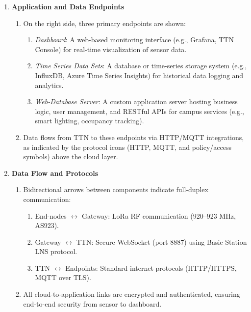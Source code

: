 \begin{enumerate}
    \item \textbf{Application and Data Endpoints}
          \begin{enumerate}
              \item On the right side, three primary endpoints are shown:
                    \begin{enumerate}
                        \item \textit{Dashboard}: A web-based monitoring interface (e.g., Grafana, TTN Console) for real-time visualization of sensor data.
                        \item \textit{Time Series Data Sets}: A database or time-series storage system (e.g., InfluxDB, Azure Time Series Insights) for historical data logging and analytics.
                        \item \textit{Web-Database Server}: A custom application server hosting business logic, user management, and RESTful APIs for campus services (e.g., smart lighting, occupancy tracking).
                    \end{enumerate}
              \item Data flows from TTN to these endpoints via HTTP/MQTT integrations, as indicated by the protocol icons (HTTP, MQTT, and policy/access symbols) above the cloud layer.
          \end{enumerate}

    \item \textbf{Data Flow and Protocols}
          \begin{enumerate}
              \item Bidirectional arrows between components indicate full-duplex communication:
                    \begin{enumerate}
                        \item End-nodes $\leftrightarrow$ Gateway: LoRa RF communication (920–923 MHz, AS923).
                        \item Gateway $\leftrightarrow$ TTN: Secure WebSocket (port 8887) using Basic Station LNS protocol.
                        \item TTN $\leftrightarrow$ Endpoints: Standard internet protocols (HTTP/HTTPS, MQTT over TLS).
                    \end{enumerate}
              \item All cloud-to-application links are encrypted and authenticated, ensuring end-to-end security from sensor to dashboard.
          \end{enumerate}
\end{enumerate}

